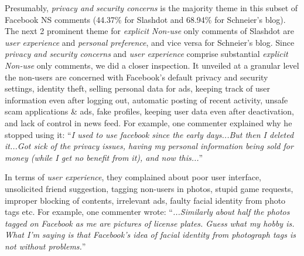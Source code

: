 
Presumably, \textit{privacy and security concerns} is the majority theme in this subset of Facebook {NS} comments (44.37\% for Slashdot and 68.94\% for Schneier's blog). The next 2 prominent theme for \emph{explicit Non-use} only comments of Slashdot are \textit{user experience} and \textit{personal preference}, and vice versa for Schneier's blog. Since \textit{privacy and security concerns} and \textit{user experience} comprise substantial \emph{explicit Non-use} only comments, we did a closer inspection. It unveiled at a granular level the non-users are concerned with Facebook's default privacy and security settings, identity theft, selling personal data for ads, keeping track of user information even after logging out, automatic posting of recent activity, unsafe scam applications \& ads, fake profiles, keeping user data even after deactivation, and lack of control in news feed. For example, one commenter explained why he stopped using it: ``\textit{I used to use facebook since the early days...But then I deleted it...Got sick of the privacy issues, having my personal information being sold for money (while I get no benefit from it), and now this...}''

In terms of \textit{user experience}, they complained about poor user interface, unsolicited friend suggestion, tagging non-users in photos, stupid game requests, improper blocking of contents, irrelevant ads, faulty facial identity from photo tags etc. For example, one commenter wrote: ``\textit{...Similarly about half the photos tagged on Facebook as me are pictures of license plates. Guess what my hobby is. What I'm saying is that Facebook's idea of facial identity from photograph tags is not without problems.}''




